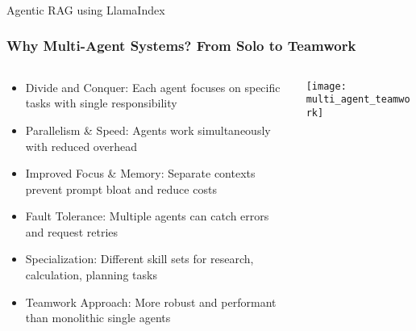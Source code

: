 \begin{frame}[fragile]\frametitle{}
\begin{center}
{\Large Agentic RAG using LlamaIndex}
\end{center}
\end{frame}

\begin{frame}[fragile]\frametitle{Why Multi-Agent Systems? From Solo to Teamwork}
\begin{columns}
    \begin{column}[T]{0.6\linewidth}
      \begin{itemize}
		\item Divide and Conquer: Each agent focuses on specific tasks with single responsibility
		\item Parallelism \& Speed: Agents work simultaneously with reduced overhead
		\item Improved Focus \& Memory: Separate contexts prevent prompt bloat and reduce costs
		\item Fault Tolerance: Multiple agents can catch errors and request retries
		\item Specialization: Different skill sets for research, calculation, planning tasks
		\item Teamwork Approach: More robust and performant than monolithic single agents
	  \end{itemize}
    \end{column}
    \begin{column}[T]{0.4\linewidth}
		\begin{center}
		\texttt{[image: multi\_agent\_teamwork]}
		\end{center}	
    \end{column}
  \end{columns}
\end{frame}

